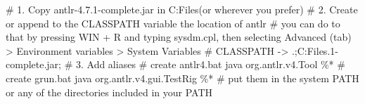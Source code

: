# 1. Copy antlr-4.7.1-complete.jar in C:\Program Files\Java\libs (or wherever you prefer)
# 2. Create or append to the CLASSPATH variable the location of antlr
# you can do to that by pressing WIN + R and typing sysdm.cpl, then selecting Advanced (tab) > Environment variables > System Variables
# CLASSPATH -> .;C:\Program Files\Java\libs{}.1-complete.jar;%
# 3. Add aliases
# create antlr4.bat  
java org.antlr.v4.Tool \%* 
# create grun.bat  
java org.antlr.v4.gui.TestRig \%*
# put them in the system PATH or any of the directories included in your PATH